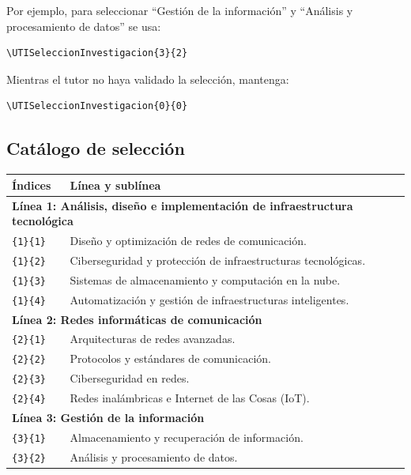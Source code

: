 \documentclass[12pt,a4paper,oneside]{report}
\begin{document}
Por ejemplo, para seleccionar ``Gestión de la información'' y ``Análisis y procesamiento de datos'' se usa:

\begin{lstlisting}
\UTISeleccionInvestigacion{3}{2}
\end{lstlisting}

Mientras el tutor no haya validado la selección, mantenga:

\begin{lstlisting}
\UTISeleccionInvestigacion{0}{0}
\end{lstlisting}

\subsection{Catálogo de selección}

\begin{longtable}{|p{2cm}|p{10.6cm}|}
  \hline
  \textbf{Índices} & \textbf{Línea y sublínea} \\
  \hline
  \multicolumn{2}{|p{12.6cm}|}{\textbf{Línea 1: Análisis, diseño e implementación de infraestructura tecnológica}} \\
  \hline
  \texttt{\{1\}\{1\}} & Diseño y optimización de redes de comunicación. \\
  \hline
  \texttt{\{1\}\{2\}} & Ciberseguridad y protección de infraestructuras tecnológicas. \\
  \hline
  \texttt{\{1\}\{3\}} & Sistemas de almacenamiento y computación en la nube. \\
  \hline
  \texttt{\{1\}\{4\}} & Automatización y gestión de infraestructuras inteligentes. \\
  \hline
  \multicolumn{2}{|p{12.6cm}|}{\textbf{Línea 2: Redes informáticas de comunicación}} \\
  \hline
  \texttt{\{2\}\{1\}} & Arquitecturas de redes avanzadas. \\
  \hline
  \texttt{\{2\}\{2\}} & Protocolos y estándares de comunicación. \\
  \hline
  \texttt{\{2\}\{3\}} & Ciberseguridad en redes. \\
  \hline
  \texttt{\{2\}\{4\}} & Redes inalámbricas e Internet de las Cosas (IoT). \\
  \hline
  \multicolumn{2}{|p{12.6cm}|}{\textbf{Línea 3: Gestión de la información}} \\
  \hline
  \texttt{\{3\}\{1\}} & Almacenamiento y recuperación de información. \\
  \hline
  \texttt{\{3\}\{2\}} & Análisis y procesamiento de datos. \\

\end{longtable}
\end{document}
